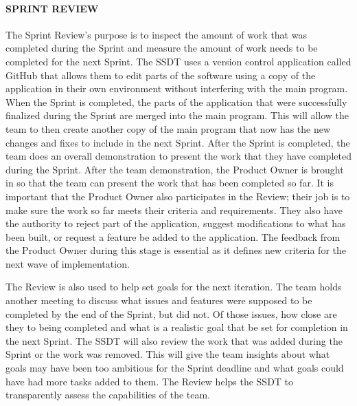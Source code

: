 \paragraph{SPRINT REVIEW}
The Sprint Review's purpose is to inspect the amount of work that was completed during the Sprint and measure the amount of work needs to be completed for the next Sprint. The SSDT uses a version control application called GitHub that allows them to edit parts of the software using a copy of the application in their own environment without interfering with the main program. When the Sprint is completed, the parts of the application that were successfully finalized during the Sprint are merged into the main program. This will allow the team to then create another copy of the main program that now has the new changes and fixes to include in the next Sprint. After the Sprint is completed, the team does an overall demonstration to present the work that they have completed during the Sprint. After the team demonstration, the Product Owner is brought in so that the team can present the work that has been completed so far. It is important that the Product Owner also participates in the Review; their job is to make sure the work so far meets their criteria and requirements. They also have the authority to reject part of the application, suggest modifications to what has been built, or request a feature be added to the application. The feedback from the Product Owner during this stage is essential as it defines new criteria for the next wave of implementation.

The Review is also used to help set goals for the next iteration. The team holds another meeting to discuss what issues and features were supposed to be completed by the end of the Sprint, but did not. Of those issues, how close are they to being completed and what is a realistic goal that be set for completion in the next Sprint. The SSDT will also review the work that was added during the Sprint or the work was removed. This will give the team insights about what goals may have been too ambitious for the Sprint deadline and what goals could have had more tasks added to them. The Review helps the SSDT to transparently assess the capabilities of the team.

